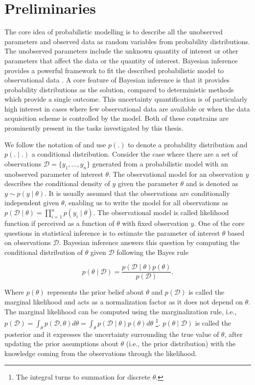 \documentclass[dissertation,math,vertlayout,pdfa,colorlinks]{aaltoseries}
\newcommand{\bD}{\mathcal{D}}
\begin{document}
\section{Preliminaries}
The core idea of probabilistic modelling is to describe all the unobserved parameters and observed data as random variables from probability distributions. The unobserved parameters include the unknown quantity of interest or other parameters that affect the data or the quantity of interest. Bayesian inference provides a powerful framework to fit the described probabilistic model to observational data \cite{Gelman2013}. A core feature of Bayesian inference is that it provides probability distributions as the solution, compared to deterministic methods which provide a single outcome. This uncertainty quantification is of particularly high interest in cases where few observational data are available or when the data acquisition scheme is controlled by the model. Both of these constrains are prominently present in the tasks investigated by this thesis.

We follow the notation of \cite{Gelman2013} and use $p(.)$ to denote a probability distribution and $p(.\mid.)$ a conditional distribution. Consider the case where there are a set of observations $\bD= \{y_1,\ldots,y_n\}$ generated from a probabilistic model with an unobserved parameter of interest $\theta$. The observational model for an observation $y$ describes the conditional density of $y$ given the parameter $\theta$ and is denoted as $y \sim p(y \mid \theta)$. It is usually assumed that the observations are conditionally independent given $\theta$, enabling us to write the model for all observations as $p(\bD \mid \theta) =  \prod_{i=1}^{n} p(y_i \mid \theta)$. The observational model is called likelihood function if perceived as a function of $\theta$ with fixed observation $y$. One of the core questions in statistical inference is to estimate the parameter of interest $\theta$ based on observations $\bD$. %
Bayesian inference answers this question by computing the conditional distribution of $\theta$ given $\bD$ following the Bayes rule


\begin{equation}\label{Eq:Bayes}
p(\theta \mid \bD) = \frac{p(\bD \mid \theta)p(\theta)}{p(\bD)}.
\end{equation}  

Where $p(\theta)$ represents the prior belief about $\theta$ and $p(\bD)$ is called the marginal likelihood and acts as a normalization factor as it does not depend on $\theta$. The marginal likelihood can be computed using the marginalization rule, i.e., $p(\bD)= \int_{\theta} p(\bD, \theta)d\theta= \int_{\theta} p(\bD \mid \theta)p(\theta) d\theta$ \footnote{The integral turns to summation for discrete $\theta$.}. $p(\theta \mid \bD)$ is called the posterior and it expresses the uncertainty surrounding the true value of $\theta$, after updating the prior assumptions about $\theta$ (i.e., the prior distribution) with the knowledge coming from the observations through the likelihood.  
\end{document}

